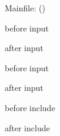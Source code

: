 \documentclass{article}
\providecommand\finkfile{}
\begin{document}
Mainfile: \currfilename (\finkfile)

before input



after input


before input


after input


before include



after include
\end{document}

